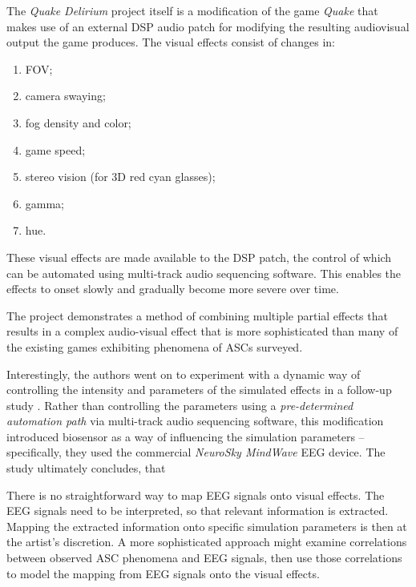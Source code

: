 The \textit{Quake Delirium} project itself is a modification of the game \textit{Quake} that makes use of an external \ac{DSP} audio patch for modifying the resulting audiovisual output the game produces. The visual effects consist of changes in:

\begin{enumerate}
    \item \ac{FOV};
    \item camera swaying;
    \item fog density and color;
    \item game speed;
    \item stereo vision (for 3D red cyan glasses);
    \item gamma;
    \item hue.
\end{enumerate}

These visual effects are made available to the \ac{DSP} patch, the control of which can be automated using multi-track audio sequencing software. This enables the effects to onset slowly and gradually become more severe over time.

The project demonstrates a method of combining multiple partial effects that results in a complex audio-visual effect that is more sophisticated than many of the existing games exhibiting phenomena of \acp{ASC} surveyed.

Interestingly, the authors went on to experiment with a dynamic way of controlling the intensity and parameters of the simulated effects in a follow-up study \autocite{weinel2015quake}. Rather than controlling the parameters using a \textit{pre-determined automation path} via multi-track audio sequencing software, this modification introduced biosensor as a way of influencing the simulation parameters -- specifically, they used the commercial \textit{NeuroSky MindWave} \ac{EEG} device. The study ultimately concludes, that 

There is no straightforward way to map \ac{EEG} signals onto visual effects. The \ac{EEG} signals need to be interpreted, so that relevant information is extracted. Mapping the extracted information onto specific simulation parameters is then at the artist's discretion. A more sophisticated approach might examine correlations between observed \ac{ASC} phenomena and \ac{EEG} signals, then use those correlations to model the mapping from \ac{EEG} signals onto the visual effects.

